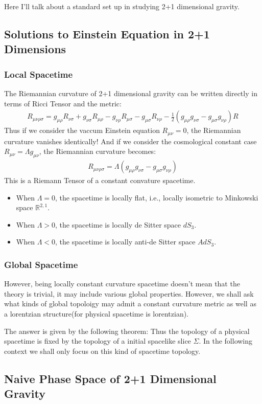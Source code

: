 Here I'll talk about a standard set up in studying 2+1 dimensional gravity.
\subsection{Solutions to Einstein Equation in 2+1 Dimensions}

\subsubsection{Local Spacetime}

The Riemannian curvature of 2+1 dimensional gravity can be written
directly in terms of Ricci Tensor and the metric:
\begin{align}
  R_{\mu\nu\rho\sigma}=g_{\mu\rho}R_{\nu\sigma}+g_{\nu\sigma}R_{\mu\rho}-g_{\nu\rho}R_{\mu\sigma}-g_{\mu\sigma}R_{\nu\rho}-\frac{1}{2}(g_{\mu\rho}g_{\nu\sigma}-g_{\mu\sigma}g_{\nu\rho})R
\end{align}
Thus if we consider the vaccum Einstein equation $R_{\mu\nu}=0$, the
Riemannian curvature vanishes identically! And if we consider the
cosmological constant case $R_{\mu\nu}=\Lambda g_{\mu\nu}$, the
Riemannian curvature becomes:
\begin{align}
  R_{\mu\nu\rho\sigma}=\Lambda(g_{\mu\rho}g_{\nu\sigma}-g_{\mu\sigma}g_{\nu\rho})
\end{align}
This is a Riemann Tensor of a constant convature spacetime.
\begin{itemize}
  \item When $\Lambda=0$, the spacetime is locally flat, i.e.,
    locally isometric to Minkowski space $\mathbb{R}^{2,1}$.
  \item When $\Lambda>0$, the spacetime is locally de Sitter space $dS_3$.
  \item When $\Lambda<0$, the spacetime is locally anti-de Sitter space $AdS_3$.
\end{itemize}

\subsubsection{Global Spacetime}

However, being locally constant curvature spacetime doesn't mean that
the theory is trivial, it may include various global properties.
However, we shall ask what kinds of global topoloigy may admit a
constant curvature metric as well as a lorentzian structure(for
physical spacetime is lorentzian).

The answer is given by the following theorem:
Thus the topology of a physical spacetime is fixed by the topology of
a initial spacelike slice $ \Sigma $. In the following context we
shall only focus on this kind of spacetime topology.

\subsection{Naive Phase Space of 2+1 Dimensional Gravity}
